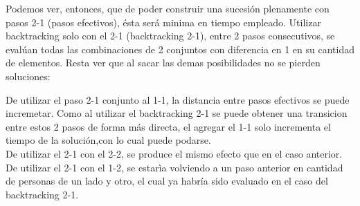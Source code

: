 Podemos ver, entonces, que de poder construir una sucesión plenamente con pasos 2-1 (pasos efectivos), ésta será minima en tiempo empleado. Utilizar backtracking solo con el 2-1 (backtracking 2-1), entre 2 pasos consecutivos, se evalúan todas las combinaciones de 2 conjuntos con diferencia en 1 en su cantidad de elementos. Resta ver que al sacar las demas posibilidades no se pierden soluciones:

De utilizar el paso 2-1 conjunto al 1-1, la distancia entre pasos efectivos se puede incremetar. Como al utilizar el backtracking 2-1 se puede obtener una transicion entre estos 2 pasos de forma más directa, el agregar el 1-1 solo incrementa el tiempo de la solución,con lo cual puede podarse.\\ 

De utilizar el 2-1 con el 2-2, se produce el mismo efecto que en el caso anterior.\\

De utilizar el 2-1 con el 1-2, se estarìa volviendo a un paso anterior en cantidad de personas de un lado y otro, el cual ya habría sido evaluado en el caso del backtracking 2-1.

 

 